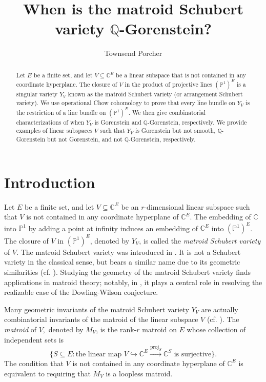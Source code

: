 \documentclass{amsart}
\title{When is the matroid Schubert variety $\mathbb{Q}$-Gorenstein?}
\author{Townsend Porcher}
\theoremstyle{plain}
\theoremstyle{definition}
\newcommand{\proj}{\operatorname{proj}}
\begin{document}
\begin{abstract}
Let $E$ be a finite set, and let $V\subseteq \mathbb{C}^E$ be a linear subspace that is not contained in any coordinate hyperplane. The closure of $V$ in the product of projective lines $(\mathbb{P}^1)^E$ is a singular variety $Y_V$ known as the matroid Schubert variety (or arrangement Schubert variety). We use operational Chow cohomology to prove that every line bundle on $Y_V$ is the restriction of a line bundle on $(\mathbb{P}^1)^E.$ We then give combinatorial characterizations of when $Y_V$ is Gorenstein and $\mathbb{Q}$-Gorenstein, respectively. We provide examples of linear subspaces $V$ such that $Y_V$ is Gorenstein but not smooth, $\mathbb{Q}$-Gorenstein but not Gorenstein, and not $\mathbb{Q}$-Gorenstein, respectively.
\end{abstract}

\maketitle

\section{Introduction}

Let $E$ be a finite set, and let $V \subseteq \mathbb{C}^E$ be an $r$-dimensional linear subspace such that $V$ is not contained in any coordinate hyperplane of $\mathbb{C}^E$. The embedding of $\mathbb{C}$ into $\mathbb{P}^1$ by adding a point at infinity induces an embedding of $\mathbb{C}^E$ into $(\mathbb{P}^1)^E$. The closure of $V$ in $(\mathbb{P}^1)^E$, denoted by $Y_V$, is called the \textit{matroid Schubert variety} of $V$. The matroid Schubert variety was introduced in \cite{ardila_boocher}. It is not a Schubert variety in the classical sense, but bears a similar name due to its geometric similarities (cf. \cite[Section 1]{singular_hodge_theory}). Studying the geometry of the matroid Schubert variety finds applications in matroid theory; notably, in \cite{huh_wang}, it plays a central role in resolving the realizable case of the Dowling-Wilson conjecture.

Many geometric invariants of the matroid Schubert variety $Y_V$ are actually combinatorial invariants of the matroid of the linear subspace $V$ (cf. \cite[Theorem 1.1]{ardila_boocher}). The \textit{matroid} of $V,$ denoted by $M_V$, is the rank-$r$ matroid on $E$ whose collection of independent sets is \[\{S \subseteq E : \text{the linear map }V \hookrightarrow \mathbb{C}^E \xrightarrow{\proj_S} \mathbb{C}^S \text{ is surjective}\}.\] 
The condition that $V$ is not contained in any coordinate hyperplane of $\mathbb{C}^E$ is equivalent to requiring that $M_V$ is a loopless matroid.
\end{document}
